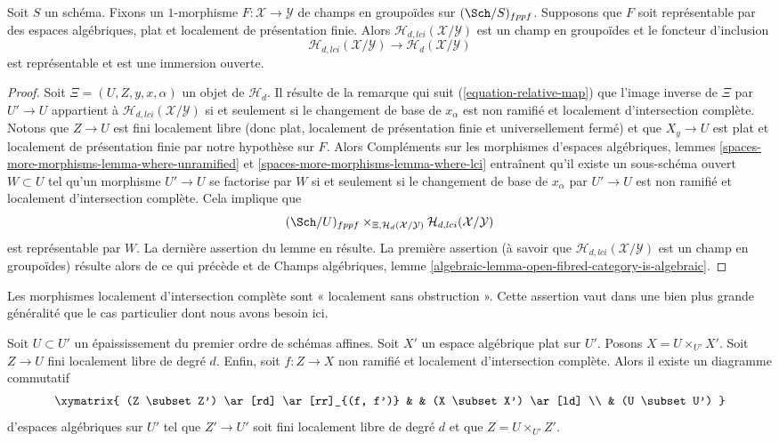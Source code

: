 \begin{lemma}
\label{lemma-lci-locus-stack-in-groupoids}
Soit $S$ un schéma. Fixons un $1$-morphisme
$F : \mathcal{X} \longrightarrow \mathcal{Y}$
de champs en groupoïdes sur $(\Sch/S)_{fppf}$.
Supposons que $F$ soit représentable par des espaces algébriques, plat et localement
de présentation finie. Alors $\mathcal{H}_{d, lci}(\mathcal{X}/\mathcal{Y})$
est un champ en groupoïdes et le foncteur d'inclusion
$$
\mathcal{H}_{d, lci}(\mathcal{X}/\mathcal{Y})
\longrightarrow
\mathcal{H}_d(\mathcal{X}/\mathcal{Y})
$$
est représentable et est une immersion ouverte.
\end{lemma}

\begin{proof}
Soit $\Xi = (U, Z, y, x, \alpha)$ un objet de $\mathcal{H}_d$. Il résulte
de la remarque qui suit
(\ref{equation-relative-map})
que l'image inverse de $\Xi$ par $U' \to U$ appartient à
$\mathcal{H}_{d, lci}(\mathcal{X}/\mathcal{Y})$ si et seulement si le changement
de base de $x_\alpha$ est non ramifié et localement d'intersection complète.
Notons que $Z \to U$ est fini localement libre (donc plat, localement de
présentation finie et universellement fermé) et que $X_y \to U$ est
plat et localement de présentation finie par notre hypothèse sur $F$. Alors
Compléments sur les morphismes d'espaces algébriques, lemmes
\ref{spaces-more-morphisms-lemma-where-unramified} et
\ref{spaces-more-morphisms-lemma-where-lci}
entraînent qu'il existe un sous-schéma ouvert $W \subset U$ tel qu'un morphisme
$U' \to U$ se factorise par $W$ si et seulement si le changement de base de
$x_\alpha$ par $U' \to U$ est non ramifié et localement d'intersection
complète. Cela implique que
$$
(\Sch/U)_{fppf}
\times_{\Xi, \mathcal{H}_d(\mathcal{X}/\mathcal{Y})}
\mathcal{H}_{d, lci}(\mathcal{X}/\mathcal{Y})
$$
est représentable par $W$. La dernière assertion du lemme
en résulte. La première assertion (à savoir que
$\mathcal{H}_{d, lci}(\mathcal{X}/\mathcal{Y})$ est un champ en groupoïdes)
résulte alors de ce qui précède et de
Champs algébriques,
lemme \ref{algebraic-lemma-open-fibred-category-is-algebraic}.
\end{proof}

\noindent
Les morphismes localement d'intersection complète sont « localement sans obstruction ».
Cette assertion vaut dans une bien plus grande généralité que le cas particulier
dont nous avons besoin ici.

\begin{lemma}
\label{lemma-lci-unobstructed}
Soit $U \subset U'$ un épaississement du premier ordre de schémas affines.
Soit $X'$ un espace algébrique plat sur $U'$. Posons $X = U \times_{U'} X'$.
Soit $Z \to U$ fini localement libre de degré $d$. Enfin, soit
$f : Z \to X$ non ramifié et localement d'intersection complète.
Alors il existe un diagramme commutatif
$$
\xymatrix{
(Z \subset Z') \ar[rd] \ar[rr]_{(f, f')} & & (X \subset X') \ar[ld] \\
& (U \subset U')
}
$$
d'espaces algébriques sur $U'$ tel que $Z' \to U'$ soit fini localement libre
de degré $d$ et que $Z = U \times_{U'} Z'$.
\end{lemma}

